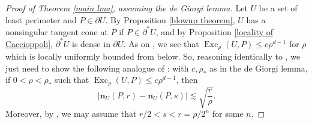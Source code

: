 \documentclass[reqno,10pt]{amsart}
\DeclareMathOperator{\Exc}{Exc}
\newcommand{\normal}{\mathbf n}
\theoremstyle{definition}
\numberwithin{equation}{section}
\begin{document}
\begin{proof}[Proof of Theorem \ref{main lma}, assuming the de Giorgi lemma]
Let $U$ be a set of least perimeter and $P \in \partial U$.
By Proposition \ref{blowup theorem}, $U$ has a nonsingular tangent cone at $P$ if $P \in \partial^* U$, and by Proposition \ref{locality of Caccioppoli}, $\partial^* U$ is dense in $\partial U$.
As on \cite[pg109]{Giusti77}, we see that $\Exc_\rho(U, P) \leq c\rho^{d - 1}$ for $\rho$ which is locally uniformly bounded from below.
So, reasoning identically to \cite[Chapters 8-9]{Giusti77}, we just need to show the following analogue of \cite[Theorem 8.2]{Giusti77}: with $c, \rho_*$ as in the de Giorgi lemma, if $0 < \rho < \rho_*$ such that $\Exc_\rho(U, P) \leq c\rho^{d - 1}$, then
\begin{equation}\label{LC Cauchy}
|\normal_U(P, r) - \normal_U(P, s)| \lesssim \sqrt{\frac{r}{\rho}}.
\end{equation}
Moreover, by \cite[pg100]{Giusti77}, we may assume that $r/2 < s < r = \rho/2^n$ for some $n$.


\end{proof}
\end{document}
